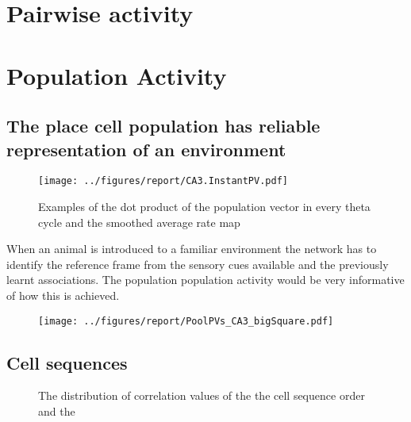\section{Pairwise activity}

\section{Population Activity}
\subsection*{The place cell population has reliable representation of an environment}

\begin{figure}[htb!]
\centering
\texttt{[image: ../figures/report/CA3.InstantPV.pdf]}
\caption[CA3 Population Vector correlations]{Examples of the dot product of the population vector in every theta cycle and the smoothed average rate map}
\end{figure}
When an animal is introduced to a familiar environment the network has to identify the reference frame from the sensory cues available and the previously learnt associations. The population population activity would be very informative of how this is achieved.

\begin{figure}[htb!]
\centering
\texttt{[image: ../figures/report/PoolPVs\_CA3\_bigSquare.pdf]}
\caption[CA3 Population activity]{}
\end{figure}
\newpage
\subsection*{Cell sequences}
\begin{figure}
\centering
{}
\caption[CA3 post-trial sleep template match analysis]{The distribution of correlation values of the the cell sequence order and the }
\label{tmcorr}
\end{figure}
\section{}
